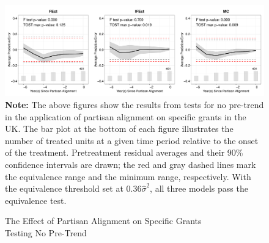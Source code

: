 \documentclass[12pt]{article}
\begin{document}
\begin{figure}[!ht]
\caption{The Effect of Partisan Alignment on Specific Grants\\Testing No Pre-Trend}\label{fg:FM2015.equiv}
\centering
\begin{minipage}{1\linewidth}{
\centering
\includegraphics[width = 1\textwidth]{ex_FM2015_equiv.pdf}}
\footnotesize\textbf{Note:} The above figures show the results from tests for no pre-trend in the application of partisan alignment on specific grants in the UK. The bar plot at the bottom of each figure illustrates the number of treated units at a given time period relative to the onset of the treatment. Pretreatment residual averages and their 90\% confidence intervals are drawn; the red and gray dashed lines mark the equivalence range and the minimum range, respectively. With the equivalence threshold set at $0.36\hat\sigma^2$, all three models pass the equivalence test. 
\end{minipage}
\end{figure}
\clearpage
\end{document}

